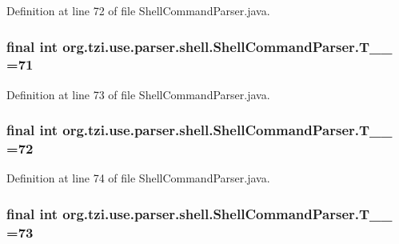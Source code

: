 Definition at line 72 of file Shell\-Command\-Parser.\-java.

\hypertarget{classorg_1_1tzi_1_1use_1_1parser_1_1shell_1_1_shell_command_parser_a4262c9e333f3d50e6601cda978b9272a}{
\subsubsection[{T\-\_\-\-\_\-71}]{\setlength{\rightskip}{0pt plus 5cm}final int org.\-tzi.\-use.\-parser.\-shell.\-Shell\-Command\-Parser.\-T\-\_\-\-\_ =71\hspace{0.3cm}{\ttfamily [static]}}}\label{classorg_1_1tzi_1_1use_1_1parser_1_1shell_1_1_shell_command_parser_a4262c9e333f3d50e6601cda978b9272a}


Definition at line 73 of file Shell\-Command\-Parser.\-java.

\hypertarget{classorg_1_1tzi_1_1use_1_1parser_1_1shell_1_1_shell_command_parser_a9bcc08fc49380c59a165f2db6544a237}{
\subsubsection[{T\-\_\-\-\_\-72}]{\setlength{\rightskip}{0pt plus 5cm}final int org.\-tzi.\-use.\-parser.\-shell.\-Shell\-Command\-Parser.\-T\-\_\-\-\_ =72\hspace{0.3cm}{\ttfamily [static]}}}\label{classorg_1_1tzi_1_1use_1_1parser_1_1shell_1_1_shell_command_parser_a9bcc08fc49380c59a165f2db6544a237}


Definition at line 74 of file Shell\-Command\-Parser.\-java.

\hypertarget{classorg_1_1tzi_1_1use_1_1parser_1_1shell_1_1_shell_command_parser_a137bc75863f95009a42a8e882b337d20}{
\subsubsection[{T\-\_\-\-\_\-73}]{\setlength{\rightskip}{0pt plus 5cm}final int org.\-tzi.\-use.\-parser.\-shell.\-Shell\-Command\-Parser.\-T\-\_\-\-\_ =73\hspace{0.3cm}{\ttfamily [static]}}}\label{classorg_1_1tzi_1_1use_1_1parser_1_1shell_1_1_shell_command_parser_a137bc75863f95009a42a8e882b337d20}


